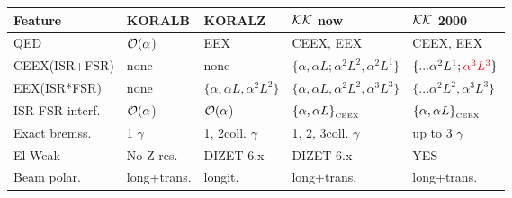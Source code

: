 \documentclass[dvips]{seminar}                      %
\def\Order#1{${\cal O}(#1$)}
\begin{document}
\begin{slide}
\vspace{-2mm}
{\scriptsize
\begin{center}
\begin{tabular}{|p{17mm}|l|l|l|l|}
\hline\hline
Feature & KORALB &KORALZ & ${\cal KK}$ now & ${\cal KK}$ 2000\\ 
\hline\hline%
%
           QED & \Order{\alpha} & EEX & CEEX, EEX & CEEX, EEX \\
\hline%
  {\tiny CEEX(ISR+FSR)}
  & none                                                     %
  & none                                                      %
  & {\tiny\color{red} $\{ \alpha,\alpha L; \alpha^2 L^2, \alpha^2 L^1 \} $}      %
  & {\tiny            $\{ ... \alpha^2 L^1; {\color{red}\alpha^3 L^3} \}$}\\%
\hline%
   {\tiny EEX(ISR*FSR)}
   & none                           %
   & {\tiny $\{ \alpha,\alpha L,\alpha^2 L^2  \}$}     %
   & {\tiny $\{ \alpha,\alpha L,\alpha^2 L^2,\alpha^3 L^3 \}$}     %
   & {\tiny $\{ ... \alpha^2 L^2,\alpha^3 L^3 \}$} \\  %
\hline%
{\tiny ISR-FSR interf.}  & {\tiny            \Order{\alpha}} 
                         & {\tiny            \Order{\alpha}} 
                         & {\tiny\color{red} $\{\alpha,\alpha L\}_{_{\rm CEEX}}$}    %
                         & {\tiny            $\{\alpha,\alpha L\}_{_{\rm CEEX}}$}\\  %
\hline%
{\tiny Exact bremss.} 
        & 1 $\gamma$  & 1, 2coll. $\gamma$  & 1, 2, 3coll. $\gamma$  & {\color{red}up to 3 $\gamma$ } \\
\hline%
       El-Weak           & No Z-res.   & DIZET 6.x   &  DIZET 6.x  & YES  \\
\hline%
\hline%
{\tiny Beam polar.}   & {\tiny long+trans.}   
                      & longit.   & {\color{red} long+trans.}   & { long+trans.}   \\
\hline%

\end{tabular}
\end{center}}
\end{slide}
\end{document}
